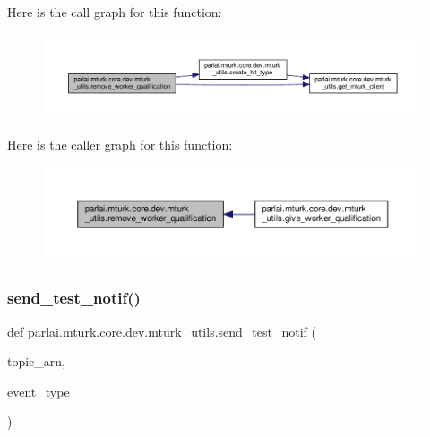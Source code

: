 Here is the call graph for this function\+:
\nopagebreak
\begin{figure}[H]
\begin{center}
\leavevmode
\includegraphics[width=350pt]{namespaceparlai_1_1mturk_1_1core_1_1dev_1_1mturk__utils_abc2c057b91641179f7c4bb50dd916488_cgraph}
\end{center}
\end{figure}
Here is the caller graph for this function\+:
\nopagebreak
\begin{figure}[H]
\begin{center}
\leavevmode
\includegraphics[width=350pt]{namespaceparlai_1_1mturk_1_1core_1_1dev_1_1mturk__utils_abc2c057b91641179f7c4bb50dd916488_icgraph}
\end{center}
\end{figure}
\mbox{\label{namespaceparlai_1_1mturk_1_1core_1_1dev_1_1mturk__utils_abfc17443a7c8018fc56dcc058e7b86f1}} 
\subsubsection{\texorpdfstring{send\+\_\+test\+\_\+notif()}{send\_test\_notif()}}
{\footnotesize\ttfamily def parlai.\+mturk.\+core.\+dev.\+mturk\+\_\+utils.\+send\+\_\+test\+\_\+notif (\begin{DoxyParamCaption}\item[{}]{topic\+\_\+arn,  }\item[{}]{event\+\_\+type }\end{DoxyParamCaption})}



